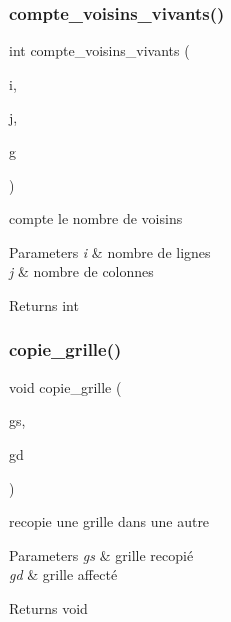 \subsubsection{\texorpdfstring{compte\+\_\+voisins\+\_\+vivants()}{compte\_voisins\_vivants()}}
{\footnotesize\ttfamily int compte\+\_\+voisins\+\_\+vivants (\begin{DoxyParamCaption}\item[{int}]{i,  }\item[{int}]{j,  }\item[{\hyperlink{structgrille}{grille}}]{g }\end{DoxyParamCaption})\hspace{0.3cm}{\ttfamily [related]}}

compte le nombre de voisins


\begin{DoxyParams}{Parameters}
{\em i} & nombre de lignes \\
\hline
{\em j} & nombre de colonnes \\
\hline
\end{DoxyParams}
\begin{DoxyReturn}{Returns}
{\ttfamily int} 
\end{DoxyReturn}
\mbox{\label{structgrille_a63b3ae16c86b568f6aa8f9ce84128b1e}} 
\subsubsection{\texorpdfstring{copie\+\_\+grille()}{copie\_grille()}}
{\footnotesize\ttfamily void copie\+\_\+grille (\begin{DoxyParamCaption}\item[{\hyperlink{structgrille}{grille}}]{gs,  }\item[{\hyperlink{structgrille}{grille}}]{gd }\end{DoxyParamCaption})\hspace{0.3cm}{\ttfamily [related]}}

recopie une grille dans une autre


\begin{DoxyParams}{Parameters}
{\em gs} & grille recopié \\
\hline
{\em gd} & grille affecté \\
\hline
\end{DoxyParams}
\begin{DoxyReturn}{Returns}
{\ttfamily void} 
\end{DoxyReturn}
\mbox{\label{structgrille_ae2f614cbe876c55ee26d1d0059f92a3c}} 
